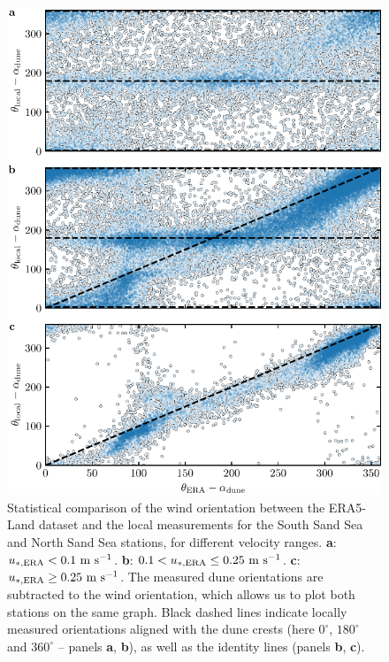 \begin{figure}[p]
\centering
\includegraphics[scale=1]{Figures/Figure6_supp.pdf}
\caption{Statistical comparison of the wind orientation between the ERA5-Land dataset and the local measurements for the South Sand Sea and North Sand Sea stations, for different velocity ranges. \textbf{a}: $u_{*, \textup{\textup{ERA}}} < 0.1~\textup{m}~\textup{s}^{-1}$. \textbf{b}: $0.1 < u_{*, \textup{\textup{ERA}}} \leq 0.25~\textup{m}~\textup{s}^{-1}$. \textbf{c}: $u_{*, \textup{\textup{ERA}}} \geq 0.25~\textup{m}~\textup{s}^{-1}$. The measured dune orientations are subtracted to the wind orientation, which allows us to plot both stations on the same graph. Black dashed lines indicate locally measured orientations aligned with the dune crests (here $0^\circ$, $180^\circ$ and $360^\circ$ -- panels \textbf{a}, \textbf{b}), as well as the identity lines (panels \textbf{b}, \textbf{c}).}
\label{Fig6_supp}
\end{figure}

